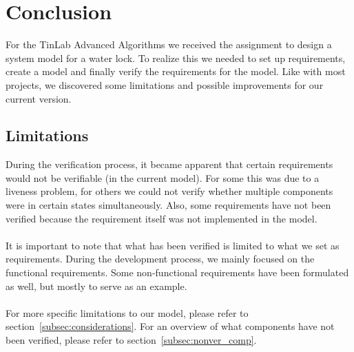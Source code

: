 \documentclass{article}
\begin{document}
\newpage

\section{Conclusion}
    For the TinLab Advanced Algorithms we received the assignment to design a system model for a water lock. To realize this we needed to set up requirements, create a model and finally verify the requirements for the model. Like with most projects, we discovered some limitations and possible improvements for our current version.
    
    \subsection{Limitations}
        During the verification process, it became apparent that certain requirements would not be verifiable (in the current model). For some this was due to a liveness problem, for others we could not verify whether multiple components were in certain states simultaneously. Also, some requirements have not been verified because the requirement itself was not implemented in the model.\\\\
        It is important to note that what has been verified is limited to what we set as requirements. During the development process, we mainly focused on the functional requirements. Some non-functional requirements have been formulated as well, but mostly to serve as an example. \\\\
        For more specific limitations to our model, please refer to section~\ref{subsec:considerations}. For an overview of what components have not been verified, please refer to section~\ref{subsec:nonver_comp}.
          
    
\end{document}
